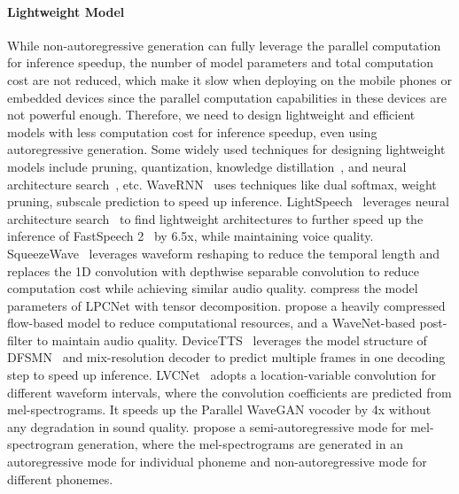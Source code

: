 \documentclass{article}
\begin{document}
\paragraph{Lightweight Model}
While non-autoregressive generation can fully leverage the parallel computation for inference speedup, the number of model parameters and total computation cost are not reduced, which make it slow when deploying on the mobile phones or embedded devices since the parallel computation capabilities in these devices are not powerful enough. Therefore, we need to design lightweight and efficient models with less computation cost for inference speedup, even using autoregressive generation. Some widely used techniques for designing lightweight models include pruning, quantization, knowledge distillation~\cite{hinton2015distilling}, and neural architecture search~\cite{luo2021lightspeech,xu2021bert}, etc. WaveRNN~\cite{kalchbrenner2018efficient} uses techniques like dual softmax, weight pruning, subscale prediction to speed up inference. LightSpeech~\cite{luo2021lightspeech} leverages neural architecture search~\cite{zoph2016neural,luo2020neural} to find lightweight architectures to further speed up the inference of FastSpeech 2~\cite{ren2021fastspeech} by 6.5x, while maintaining voice quality. SqueezeWave~\cite{zhai2020squeezewave} leverages waveform reshaping to reduce the temporal length and replaces the 1D convolution with depthwise separable convolution to reduce computation cost while achieving similar audio quality. \citet{kanagawa2020lightweight} compress the model parameters of LPCNet with tensor decomposition. \citet{hsu2020wg} propose a heavily compressed flow-based model to reduce computational resources, and a WaveNet-based post-filter to maintain audio quality. DeviceTTS~\cite{huang2020devicetts} leverages the model structure of DFSMN~\cite{zhang2018deep} and mix-resolution decoder to predict multiple frames in one decoding step to speed up inference. LVCNet~\cite{zeng2021lvcnet} adopts a location-variable convolution for different waveform intervals, where the convolution coefficients are predicted from mel-spectrograms. It speeds up the Parallel WaveGAN vocoder by 4x without any degradation in sound quality. \citet{wangfcl} propose a semi-autoregressive mode for mel-spectrogram generation, where the mel-spectrograms are generated in an autoregressive mode for individual phoneme and non-autoregressive mode for different phonemes.
\end{document}
